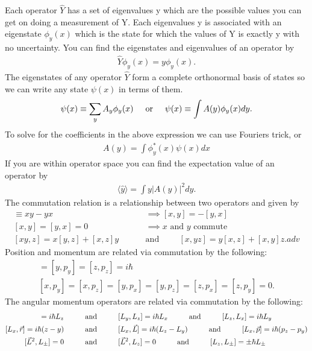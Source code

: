 Each operator $\hat{Y}$ has a set of eigenvalues y which are the possible values you can get on doing a measurement of Y. Each eigenvalues y is associated with an eigenstate $\phi_y(x)$ which is the state for which the values of Y is exactly y with no uncertainty. You can find the eigenstates and eigenvalues of an operator by 
\begin{align}
	\hat{Y}\phi_y(x) = y \phi_y(x).
\end{align}
The eigenstates of any operator $\hat{Y}$ form a complete orthonormal basis of states so we can write any state $\psi(x)$ in terms of them.
\begin{align}
	\psi(x) \equiv \sum_{y}A_y\phi_y(x) \hspace{0.5cm}\textrm{or}\hspace{0.5cm} \psi(x) \equiv \int A(y)\phi_y(x)dy.
\end{align}
To solve for the coefficients in the above expression we can use Fouriers trick, or
\begin{align}
	A(y) = \int \phi_y^*(x)\psi(x)dx 	
\end{align}
If you are within operator space you can find the expectation value of an operator by
\begin{align}
	\langle \hat{y} \rangle = \int y |A(y)|^2 dy.
\end{align}
The commutation relation is a relationship between two operators and given by
\begin{align}
	[x,y] \equiv xy-yx &\implies [x,y] = -[y,x] \\
	[x,y]=[y,x]=0 &\implies \textrm{$x$ and $y$ commute} \\
	[xy,z] = x[y,z]+[x,z]y \hspace{1cm} &\textrm{and} \hspace{1cm}[x,yz] = y[x,z]+[x,y]z.adv
\end{align} 
Position and momentum are related via commutation by the following:
\begin{align}
	[x,p_x]=[y,p_y]=[z,p_z]=i\hbar \\
	[x,p_y]=[x,p_z]=[y,p_x]=[y,p_z]=[z,p_x]=[z,p_y]=0.
\end{align} 
The angular momentum operators are related via commutation by the following:
\begin{align}
	[L_x,L_y]=i\hbar L_z \andspace{1cm} &[L_y,L_z]=i\hbar L_x \andspace{1cm} [L_z,L_x]=i\hbar L_y \\
	[L_x,\vec{r}]=i\hbar (z-y) \andspace{1cm} &[L_x,\vec{L}] = i\hbar (L_z-L_y) \andspace{1cm} [L_x,\vec{p}] = i\hbar(p_z-p_y) \\
	[\vec{L}^2,L_\pm]=0 \andspace{1cm}&[\vec{L}^2,L_z] = 0 \andspace{1cm} [L_z,L_\pm]=\pm \hbar L_\pm
\end{align}
